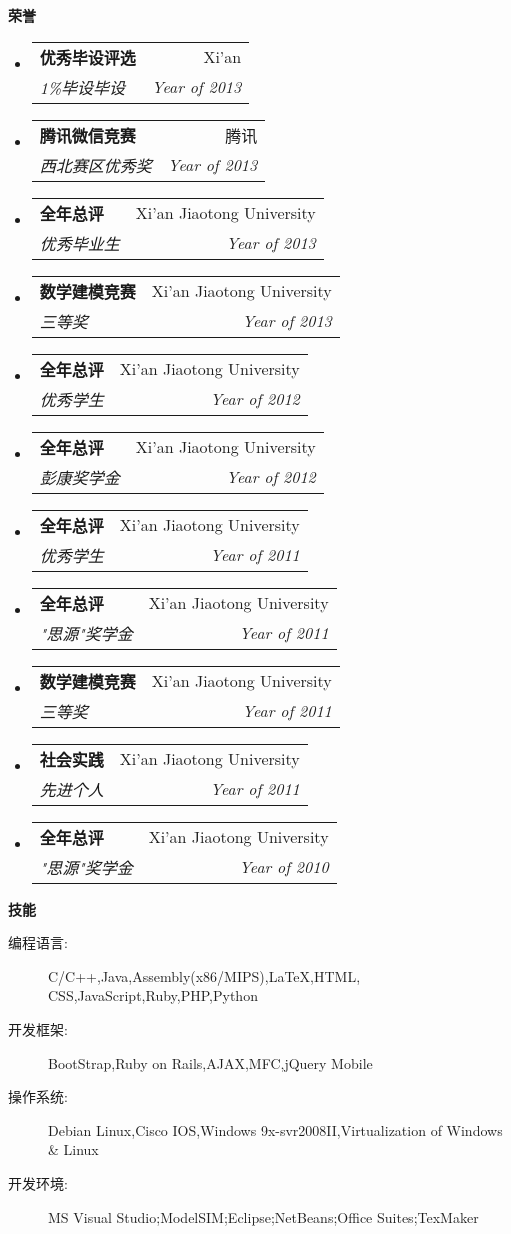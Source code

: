 \documentclass[letterpaper,11pt]{article}
\makeatletter
\newcommand{\resheading}[1]{{\large \colorbox{mygrey}{\begin{minipage}{\textwidth}{\textbf{#1 \vphantom{p\^{E}}}}\end{minipage}}}}
\newcommand{\ressubheading}[4]{
\begin{tabular*}{6.5in}{l@{\extracolsep{\fill}}r}
		\textbf{#1} & #2 \\
		\textit{#3} & \textit{#4} \\
\end{tabular*}\vspace{-6pt}}
\makeatother
\begin{document}
\begin{CJK}{UTF8}{gbsn}
\resheading{荣誉}
	\begin{itemize}
		\item
			\ressubheading{优秀毕设评选}{Xi'an}{1\%毕设毕设}{Year of 2013}
		\item
			\ressubheading{腾讯微信竞赛}{腾讯}{西北赛区优秀奖}{Year of 2013}
		\item
			\ressubheading{全年总评}{Xi'an Jiaotong University}{优秀毕业生}{Year of 2013}
		\item
			\ressubheading{数学建模竞赛}{Xi'an Jiaotong University}{三等奖}{Year of 2013}
		\item
			\ressubheading{全年总评}{Xi'an Jiaotong University}{优秀学生}{Year of 2012}
		\item
			\ressubheading{全年总评}{Xi'an Jiaotong University}{彭康奖学金}{Year of 2012}
		\item
			\ressubheading{全年总评}{Xi'an Jiaotong University}{优秀学生}{Year of 2011}
		\item
			\ressubheading{全年总评}{Xi'an Jiaotong University}{"思源"奖学金}{Year of 2011}
		\item
			\ressubheading{数学建模竞赛}{Xi'an Jiaotong University}{三等奖}{Year of 2011}
		\item
			\ressubheading{社会实践}{Xi'an Jiaotong University}{先进个人}{Year of 2011}
		\item
			\ressubheading{全年总评}{Xi'an Jiaotong University}{"思源"奖学金}{Year of 2010}
		\end{itemize}
	
\resheading{技能}
	\begin{description}
		\item[编程语言:] { \footnotesize C/C++,Java,Assembly(x86/MIPS),LaTeX,HTML, CSS,JavaScript,Ruby,PHP,Python}
		\item[开发框架:] { \footnotesize BootStrap,Ruby on Rails,AJAX,MFC,jQuery Mobile}
		\item[操作系统:] { \footnotesize Debian Linux,Cisco IOS,Windows 9x-svr2008II,Virtualization of Windows \& Linux}
		\item[开发环境:]{\footnotesize {MS Visual Studio};{ModelSIM};{Eclipse};{NetBeans};{Office Suites};{TexMaker}}  
	\end{description} %
\end{CJK}
\end{document}
